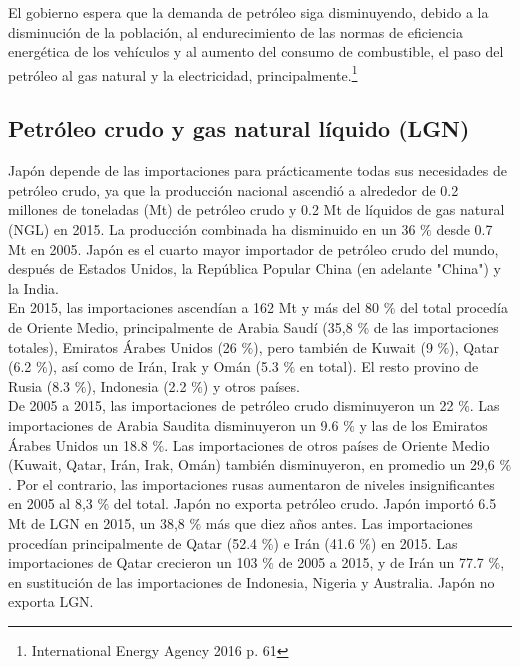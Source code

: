 \documentclass[]{article}
\begin{document}
 El gobierno espera que la demanda de petróleo siga disminuyendo,
debido a la disminución de la población, al endurecimiento de las normas de eficiencia energética de los vehículos y al aumento del consumo de combustible, el paso del petróleo al gas natural y la electricidad, principalmente.\citep{International Energy Agency 2016}\footnote{International Energy Agency 2016 p. 61}\\


\subsection{Petróleo crudo y gas natural líquido (LGN)}

Japón depende de las importaciones para prácticamente todas sus necesidades de petróleo crudo, ya que la producción nacional ascendió a alrededor de 0.2 millones de toneladas (Mt) de petróleo crudo y 0.2 Mt de líquidos de gas natural (NGL) en 2015. La producción combinada ha disminuido en un 36 $\%$ desde 0.7 Mt en 2005. Japón es el cuarto mayor importador de petróleo crudo del mundo, después de Estados Unidos, la República Popular China (en adelante "China") y la India.\\

 En 2015, las importaciones ascendían a 162 Mt y más del 80 $\%$ del total procedía de Oriente Medio, principalmente de Arabia Saudí (35,8 $\%$ de las importaciones totales), Emiratos Árabes Unidos (26 $\%$), pero también de Kuwait (9 $\%$), Qatar (6.2 $\%$), así como de Irán, Irak y Omán (5.3 $\%$ en total). El resto provino de Rusia (8.3 $\%$), Indonesia (2.2 $\%$) y otros países.\\
 De 2005 a 2015, las importaciones de petróleo crudo disminuyeron un 22 $\%$. Las importaciones de Arabia Saudita disminuyeron un 9.6 $\%$ y las de los Emiratos Árabes Unidos un 18.8 $\%$. Las importaciones de otros países de Oriente Medio (Kuwait, Qatar, Irán, Irak, Omán) también disminuyeron, en promedio un 29,6 $\%$. Por el contrario, las importaciones rusas aumentaron de niveles insignificantes en 2005 al 8,3 $\%$ del total. Japón no exporta petróleo crudo. Japón importó 6.5 Mt de LGN en 2015, un 38,8 $\%$ más que diez años antes. Las importaciones procedían principalmente de Qatar (52.4 $\%$) e Irán (41.6 $\%$) en 2015. Las importaciones de Qatar crecieron un 103 $\%$ de 2005 a 2015, y de Irán un 77.7 $\%$, en sustitución de las importaciones de Indonesia, Nigeria y Australia. Japón no exporta LGN.\citep{InternationalEnergyAgency2016}\\
\end{document}
